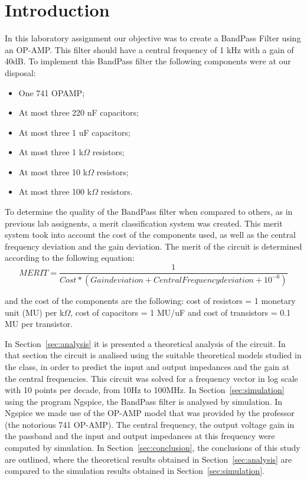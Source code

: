 \section{Introduction}
\label{sec:introduction}


\par In this laboratory assignment our objective was to create a BandPass Filter using an OP-AMP. This filter should have a central frequency of 1 kHz with a gain of 40dB. To implement this BandPass filter the following components were at our disposal: 
\begin{itemize}

\item One 741 OPAMP;
\item At most three 220 nF capacitors;
\item At most three 1 uF capacitors;
\item At most three 1 k$\Omega$ resistors;
\item At most three 10 k$\Omega$ resistors;
\item At most three 100 k$\Omega$ resistors.

\end{itemize} 


\par   
To determine the quality of the BandPass filter when compared to others, as in previous lab assignents, a merit classification system was created. This merit system took into account the cost of the components used, as well as the central frequency deviation and the gain deviation. The merit of the circuit is determined according to the following equation: 
\begin {equation}
	 MERIT = \frac{1}{Cost*(Gain deviation + Central Frequency deviation + 10^{-6})  }   	
	\label{eq:i1}
\end{equation}

and the cost of the components are the following: cost of resistors = 1 monetary unit (MU) per k$\Omega$, cost of capacitors = 1 MU/uF
and cost of transistors = 0.1 MU per transistor. 

In Section~\ref{sec:analysis} it is
presented a theoretical analysis of the circuit. In that section the circuit is analised using the suitable theoretical models studied in the class, in order to predict the input and output impedances and the gain at the central frequencies. This circuit was solved for a frequency vector in log scale with 10 points per decade, from 10Hz to 100MHz. 
In Section~\ref{sec:simulation} using the program Ngspice, the BandPass filter is analysed by
simulation. In Ngspice we made use of the OP-AMP model that was provided by the professor (the notorious 741 OP-AMP). The central frequency, the output voltage gain in the passband and the input and output impedances at this frequency were computed by simulation. 
In Section~\ref{sec:conclusion}, the conclusions of this study are outlined, where the theoretical results obtained in Section~\ref{sec:analysis} are compared to the simulation results obtained in Section~\ref{sec:simulation}.





\pagebreak

